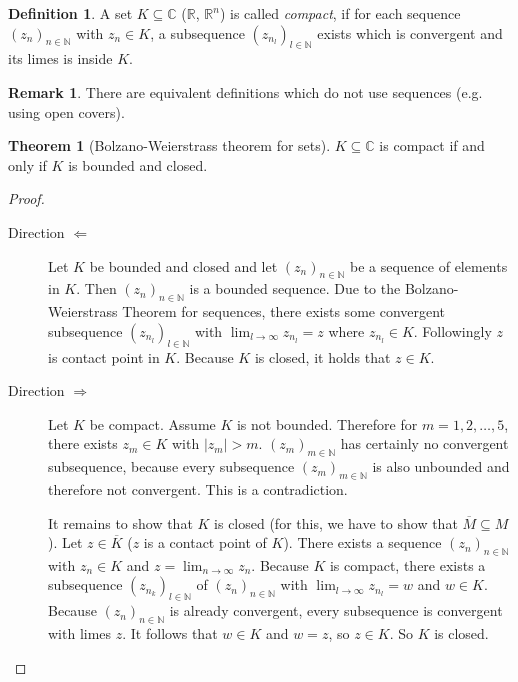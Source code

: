 \documentclass[a4paper,landscape,twocolumn]{article}
\theoremstyle{definition}
\newtheorem{theorem}{Theorem}
\newtheorem{defi}{Definition}
\newtheorem{rem}{Remark}
\newcommand\abs[1]{\left|#1\right|}
\newcommand\seq[1]{{\left(#1\right)}_{n \in \mathbb N}}
\begin{document}
\begin{defi}
  A set $K \subseteq \mathbb C$ ($\mathbb R$, $\mathbb R^n$) is called \emph{compact},
  if for each sequence $\seq{z_n}$ with $z_n \in K$,
  a subsequence $\left(z_{n_l}\right)_{l \in \mathbb N}$
  exists which is convergent and its limes is inside $K$.
\end{defi}
%
\begin{rem}
  There are equivalent definitions which do not use sequences (e.g. using open covers).
\end{rem}
%
\begin{theorem}[Bolzano-Weierstrass theorem for sets]
  $K \subseteq \mathbb C$ is compact if and only if $K$ is bounded and closed.
\end{theorem}
\begin{proof}
  \begin{description}
    \item[Direction $\Leftarrow$]
      Let $K$ be bounded and closed and let $\seq{z_n}$ be a sequence of elements
      in $K$. Then $\seq{z_n}$ is a bounded sequence. Due to the Bolzano-Weierstrass
      Theorem for sequences, there exists some convergent subsequence
      $\left(z_{n_l}\right)_{l \in \mathbb N}$ with $\lim_{l\to\infty} z_{n_l} = z$
      where $z_{n_l} \in K$. Followingly $z$ is contact point in $K$.
      Because $K$ is closed, it holds that $z \in K$.
    \item[Direction $\Rightarrow$]
      Let $K$ be compact. Assume $K$ is not bounded.
      Therefore for $m = 1, 2, \dots, 5$, there exists $z_m \in K$ with $\abs{z_m} > m$.
      $\left(z_m\right)_{m\in\mathbb N}$ has certainly no convergent subsequence, because
      every subsequence $\left(z_m\right)_{m\in\mathbb N}$ is also unbounded and
      therefore not convergent. This is a contradiction.

      It remains to show that $K$ is closed (for this, we have to show that $\overline M \subseteq M$).
      Let $z \in \overline{K}$ ($z$ is a contact point of $K$).
      There exists a sequence $\seq{z_n}$ with $z_n \in K$ and $z = \lim_{n\to\infty} z_n$.
      Because $K$ is compact, there exists a subsequence $\left(z_{n_k}\right)_{l\in\mathbb N}$ of
      $\seq{z_n}$ with $\lim_{l\to\infty} z_{n_l} = w$ and $w \in K$.
      Because $\seq{z_n}$ is already convergent, every subsequence is convergent
      with limes $z$.
      It follows that $w \in K$ and $w = z$, so $z \in K$. So $K$ is closed.
  \end{description}
\end{proof}
\end{document}
